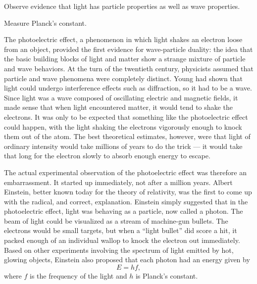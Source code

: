 \label{lab:photoelectric-effect}

\apparatus
{}

\begin{goals}

\item[] Observe evidence that light has particle properties as
well as wave properties.

\item[] Measure Planck's constant.
\end{goals}

\introduction

The photoelectric effect, a phenomenon in which light shakes
an electron loose from an object, provided the first
evidence for wave-particle duality: the idea that the basic
building blocks of light and matter show a strange mixture
of particle and wave behaviors. At the turn of the twentieth
century, physicists assumed that particle and wave phenomena
were completely distinct. Young had shown that light could
undergo interference effects such as diffraction, so it had
to be a wave. Since light was a wave composed of oscillating
electric and magnetic fields, it made sense that when light
encountered matter, it would tend to shake the electrons. It
was only to be expected that something like the photoelectric
effect could happen, with the light shaking the electrons
vigorously enough to knock them out of the atom. The best
theoretical estimates, however, were that light of ordinary
intensity would take millions of years to do the trick ---
it would take that long for the electron slowly to absorb
enough energy to escape.

The actual experimental observation of the photoelectric
effect was therefore an embarrassment. It started up
immediately, not after a million years. Albert Einstein,
better known today for the theory of relativity, was the
first to come up with the radical, and correct, explanation.
Einstein simply suggested that in the photoelectric effect,
light was behaving as a particle, now called a photon. The
beam of light could be visualized as a stream of machine-gun
bullets. The electrons would be small targets, but when a
``light bullet'' did score a hit, it packed enough of an
individual wallop to knock the electron out immediately.
Based on other experiments involving the spectrum of light
emitted by hot, glowing objects, Einstein also proposed that
each photon had an energy given by
\begin{equation*}
         E  =  hf  ,  
\end{equation*}
where $f$ is the frequency of the light and $h$ is Planck's constant.

